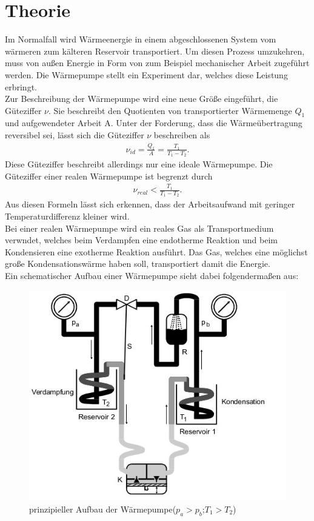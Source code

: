 \section{Theorie}\justifying
Im Normalfall wird Wärmeenergie in einem abgeschlossenen System vom wärmeren zum kälteren Reservoir transportiert. Um diesen Prozess 
umzukehren, muss von außen Energie in Form von zum Beispiel mechanischer Arbeit zugeführt werden.
Die Wärmepumpe stellt ein Experiment dar, welches diese Leistung erbringt. \\
Zur Beschreibung der Wärmepumpe wird eine neue Größe eingeführt, die Güteziffer $\nu$.
Sie beschreibt den Quotienten von transportierter Wärmemenge $Q_1$ und aufgewendeter
Arbeit A. Unter der Forderung, dass die Wärmeübertragung reversibel sei, lässt
sich die Güteziffer $\nu$ beschreiben als \cite{V206}
\begin{align}
    \nu _{id} = \frac{Q_1}{A}=\frac{T_1}{T_1-T_2}. \label{eq:1}
\end{align}
Diese Güteziffer beschreibt allerdings nur eine ideale Wärmepumpe. Die
Güteziffer einer realen Wärmepumpe ist begrenzt durch \cite{V206}
\begin{align}
    \nu _{real} < \frac{T_1}{T_1-T_2}. \label{eq:2}
\end{align}
Aus diesen Formeln  lässt sich erkennen, dass der Arbeitsaufwand mit geringer 
Temperaturdifferenz kleiner wird.\\
Bei einer realen Wärmepumpe wird ein reales Gas als Transportmedium verwndet, welches
beim Verdampfen eine endotherme Reaktion und beim Kondensieren eine exotherme Reaktion
ausführt. Das Gas, welches eine möglichst große Kondensationswärme haben soll, transportiert
damit die Energie. \\
Ein schematischer Aufbau einer Wärmepumpe sieht dabei folgendermaßen aus: \cite{V206}
\begin{figure}
    \centering
    \includegraphics[width=0.75\linewidth]{./images/theo_Aufbau.jpg}
    \caption{prinzipieller Aufbau der Wärmepumpe($p_a>p_b$;$T_1>T_2$)} 
    \label{fig:1}
\end{figure}

